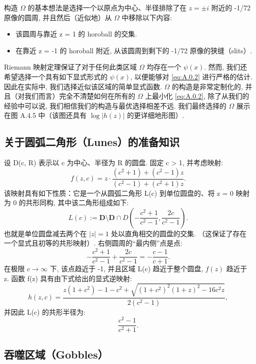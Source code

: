 构造 \(\Omega\) 的基本想法是选择一个以原点为中心、半径排除了在 \(z = \pm i\) 附近的 -1/72 
原像的圆周, 
并且然后（近似地）从 \(\Omega\) 中移除以下内容:
\begin{itemize}
  \item[(1)] 该圆周与靠近 z = 1 的 horoball 的交集.
  \item[(2)] 在靠近 z = -1 的 horoball 附近, 从该圆周到剩下的 -1/72 原像的狭缝（slits）.
\end{itemize}

Riemann 映射定理保证了对于任何此类区域 \(\Omega\) 均存在一个 \(\psi(x)\). 
然而, 我们还希望选择一个具有如下显式形式的 \(\psi(x)\), 
以便能够对 \eqref{eq:A.0.2} 进行严格的估计. 
因此在实际中, 我们选择近似该区域的简单显式函数. 
\(\Omega\) 的构造是非常定制化的, 
并且（对我们而言）完全不清楚如何在所有的 \(\Omega\) 
上最小化 \eqref{eq:A.0.2}, 
除了从我们的经验中可以说, 我们相信我们的构造与最优选择相差不远. 
我们最终选择的 \(\Omega\) 展示在图 A.4.5 中（该图还具有 \(\log |h(z)|\) 的更详细地形图）.

\subsection{关于圆弧二角形（Lunes）的准备知识}\label{sec:A.1}

设 D(c, R) 表示以 c 为中心、半径为 R 的圆盘. 
固定 c > 1, 并考虑映射:
\[ f(z,c) = z \cdot \frac{(c^2+1) + (c^2-1)z}{(c^2-1) + (c^2+1)z}. \]
该映射具有如下性质：它是一个从圆弧二角形 L(c) 
到单位圆盘的、将 z = 0 映射为 0 的共形同构, 
其中该二角形组成如下:
\[ L(c) := \mathbf{D} \setminus \mathbf{D} \cap D\left(-\frac{c^2+1}{c^2-1}, \frac{2c}{c^2-1}\right). \]
也就是单位圆盘减去两个在 \(|z| = 1\) 处以直角相交的圆盘的交集. 
（这保证了存在一个显式且初等的共形映射）. 
右侧圆周的“最内侧”点是点:
\[ -\frac{c^2+1}{c^2-1} + \frac{2c}{c^2-1} = -\frac{c-1}{c+1}. \]
在极限 \(c \to \infty\) 下, 该点趋近于 -1, 
并且区域 L(c) 趋近于整个圆盘, \(f(z)\) 趋近于 z. 
函数 f(z) 具有由下式给出的显式逆映射:
\begin{equation}\label{eq:A.1.1}
h(z,c) = \frac{z(1+c^2) - 1 - c^2 + \sqrt{(1+c^2)^2(1+z)^2 - 16c^2z}}{2(c^2 - 1)},
\end{equation}
并因此 L(c) 的共形半径为:
\begin{equation}\label{eq:A.1.2}
\frac{c^2 - 1}{c^2 + 1}.
\end{equation}

\subsection{吞噬区域（Gobbles）}\label{sec:A.2}

